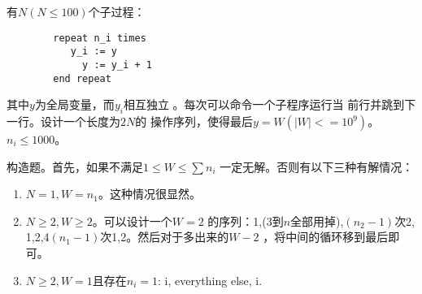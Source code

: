 \begin{prob}
	有$N(N \le 100)$个子过程：
	\begin{verbatim}
	    repeat n_i times
	       y_i := y
	         y := y_i + 1
	    end repeat
	\end{verbatim}
	\par
	其中$y$为全局变量，而$y_i$相互独立
	。每次可以命令一个子程序运行当
	前行并跳到下一行。设计一个长度为$2N$的
	操作序列，使得最后$y = W(|W|<=10^9)$。$n_i \le 1000$。
\end{prob}

\begin{sol}
	构造题。首先，如果不满足$1 \le W \le \sum n_i$
	一定无解。否则有以下三种有解情况：
	\begin{enumerate}
		\item $N=1, W=n_1$。这种情况很显然。
		\item $N\ge 2,W\ge 2$。可以设计一个$W=2$
			的序列：1,(3到$n$全部用掉),$(n_2-1)$次2,
			1,2,4$(n_1-1)$次1,2。然后对于多出来的$W-2$
			，将中间的循环移到最后即可。
		\item $N\ge 2, W=1$且存在$n_i=1$: i, everything else, i.
	\end{enumerate}
\end{sol}
